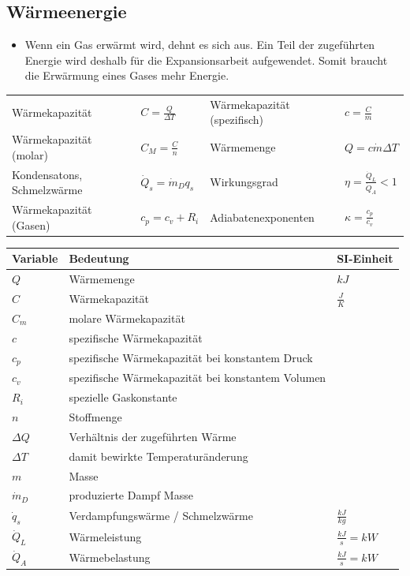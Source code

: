 \documentclass[
a4paper,
oneside,
landscape, 
8pt,
]{scrartcl}
\begin{document}
\begin{multicols*}{2}
\subsection{Wärmeenergie}
\begin{itemize}
	\item Wenn ein Gas erwärmt wird, dehnt es sich aus. Ein Teil der zugeführten Energie wird deshalb für die Expansionsarbeit aufgewendet. Somit braucht die Erwärmung eines Gases mehr Energie.
\end{itemize}
\begin{tabbing}
	\begin{tabu} to \linewidth {l X l X}
		\toprule
		Wärmekapazität & $C = \frac{Q}{\Delta T}$  &
		Wärmekapazität (spezifisch) & $c = \frac{C}{m}$  \\
		Wärmekapazität (molar) & $C_M = \frac{C}{n}$ &
		Wärmemenge & $Q = c \dot m \Delta T $ \\
		Kondensatons, Schmelzwärme & $\dot Q_s = \dot m_D q_s$ &
		Wirkungsgrad & $\eta = \frac{\dot Q_L}{\dot Q_A} < 1$ \\
		Wärmekapazität (Gasen) & $c_p = c_v + R_i$ &
		Adiabatenexponenten & $\kappa = \frac{c_p}{c_v}$ \\
	\end{tabu}
\end{tabbing}


\begin{tabbing}
	\begin{tabu} to \linewidth {l X l}
		Variable & Bedeutung & SI-Einheit \\
		\midrule
		$Q$ & Wärmemenge & $kJ$ \\
		$C$ & Wärmekapazität &  $\frac{J}{K}$\\
		$C_m$ & molare Wärmekapazität & \\
		$c$ & spezifische Wärmekapazität & \\
		$c_p$ & spezifische Wärmekapazität bei konstantem Druck & \\
		$c_v$ & spezifische Wärmekapazität bei konstantem Volumen & \\
		$R_i$ & spezielle Gaskonstante & \\
		$n$ & Stoffmenge & \\
		$\Delta Q$ & Verhältnis der zugeführten Wärme &  \\
		$\Delta T$ & damit bewirkte Temperaturänderung &  \\
		$m$ & Masse & \\
		$\dot m_D$ & produzierte Dampf Masse & \\
		$\dot q_s$ & Verdampfungswärme / Schmelzwärme & $\frac{kJ}{kg}$\\
		$\dot Q_L$ & Wärmeleistung & $\frac{kJ}{s} = kW$\\
		$\dot Q_A$ & Wärmebelastung & $\frac{kJ}{s} = kW$\\
		\bottomrule
	\end{tabu}
\end{tabbing}


\end{multicols*}
\end{document}
